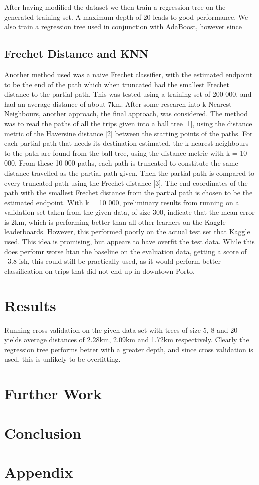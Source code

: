 \documentclass[12pt]{article}
\begin{document}
After having modified the dataset we then train a regression tree on the generated training set. A maximum depth of 20 leads to good performance. We also train a regression tree used in conjunction with AdaBoost, however since 

\subsection{Frechet Distance and KNN}
Another method used was a naive Frechet classifier, with the estimated endpoint to be the end of the path which when truncated had the smallest Frechet distance to the partial path. This was tested using a training set of 200 000, and had an average distance of about 7km. 
After some research into k Nearest Neighbours, another approach, the final approach, was considered. 
The method was to read the paths of all the trips given into a ball tree [1], using the distance metric of the Haversine distance [2] between the starting points of the paths. 
For each partial path that needs its destination estimated, the k nearest neighbours to the path are found from the ball tree, using the distance metric with k = 10 000. From these 10 000 paths, each path is truncated to constitute the same distance travelled as the partial path given. Then the partial path is compared to every truncated path using the Frechet distance [3]. The end coordinates of the path with the smallest Frechet distance from the partial path is chosen to be the estimated endpoint. 
With k = 10 000, preliminary results from running on a validation set taken from the given data, of size 300, indicate that the mean error is 2km, which is performing better than all other learners on the Kaggle leaderboards. However, this performed poorly on the actual test set that Kaggle used. This idea is promising, but appears to have overfit the test data. While this does perfomr worse htan the baseline on the evaluation data, getting a score of ~3.8 ish, this could still be practically used, as it would perform better classification on trips that did not end up in downtown Porto. 


\section{Results}
Running cross validation on the given data set with trees of size 5, 8 and 20 yields average distances of 2.28km, 2.09km and 1.72km respectively. Clearly the regression tree performs better with a greater depth, and since cross validation is used, this is unlikely to be overfitting. 

\section{Further Work}

\section{Conclusion}

\section{Appendix}
\end{document}
